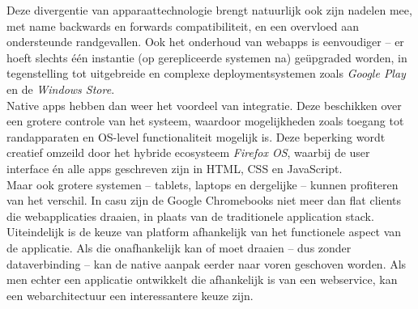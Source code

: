 \documentclass[10pt,a4paper]{article}
\begin{document}
		Deze divergentie van apparaattechnologie brengt natuurlijk ook zijn nadelen mee, met name backwards en forwards compatibiliteit, en een overvloed aan ondersteunde randgevallen. Ook het onderhoud van webapps is eenvoudiger -- er hoeft slechts \'e\'en instantie (op gerepliceerde systemen na) ge\"upgraded worden, in tegenstelling tot uitgebreide en complexe deploymentsystemen zoals \textit{Google Play} en de \textit{Windows Store}.\\

		Native apps hebben dan weer het voordeel van integratie. Deze beschikken over een grotere controle van het systeem, waardoor mogelijkheden zoals toegang tot randapparaten en OS-level functionaliteit mogelijk is. Deze beperking wordt creatief omzeild door het hybride ecosysteem \textit{Firefox OS}, waarbij de user interface \'en alle apps geschreven zijn in HTML, CSS en JavaScript.\\

		\noindent Maar ook grotere systemen -- tablets, laptops en dergelijke -- kunnen profiteren van het verschil. In casu zijn de Google Chromebooks niet meer dan flat clients die webapplicaties draaien, in plaats van de traditionele application stack.\\

		\noindent Uiteindelijk is de keuze van platform afhankelijk van het functionele aspect van de applicatie. Als die onafhankelijk kan of moet draaien -- dus zonder dataverbinding -- kan de native aanpak eerder naar voren geschoven worden. Als men echter een applicatie ontwikkelt die afhankelijk is van een webservice, kan een webarchitectuur een interessantere keuze zijn.
\end{document}
